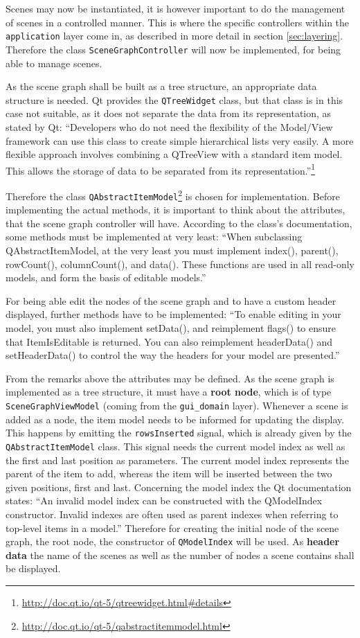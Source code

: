 \documentclass[10pt, openright, notitlepage]{scrreprt}
\begin{document}
Scenes may now be instantiated, it is however important to do the management of
scenes in a controlled manner. This is where the specific controllers within the
\texttt{application} layer come in, as described in more detail in section
\ref{sec:layering}. Therefore the class \texttt{SceneGraphController} will now be
implemented, for being able to manage scenes.

As the scene graph shall be built as a tree structure, an appropriate data
structure is needed. Qt provides the \texttt{QTreeWidget} class, but that
class is in this case not suitable, as it does not separate the data from its
representation, as stated by Qt: ``Developers who do not need the flexibility of
the Model/View framework can use this class to create simple hierarchical lists
very easily. A more flexible approach involves combining a QTreeView with a
standard item model. This allows the storage of data to be separated from its
representation.''\footnote{\url{http://doc.qt.io/qt-5/qtreewidget.html\#details}}

Therefore the class
\texttt{QAbstractItemModel}\footnote{\url{http://doc.qt.io/qt-5/qabstractitemmodel.html}}
is chosen for implementation. Before implementing the actual methods, it is
important to think about the attributes, that the scene graph controller will
have. According to the class's documentation, some methods must be implemented
at very least: ``When subclassing QAbstractItemModel, at the very least you must
implement index(), parent(), rowCount(), columnCount(), and data(). These
functions are used in all read-only models, and form the basis of editable
models.''

For being able edit the nodes of the scene graph and to have a custom header
displayed, further methods have to be implemented: ``To enable editing in your
model, you must also implement setData(), and reimplement flags() to ensure that
ItemIsEditable is returned. You can also reimplement headerData() and
setHeaderData() to control the way the headers for your model are presented.''

From the remarks above the attributes may be defined. As the scene graph is
implemented as a tree structure, it must have a \textbf{root node}, which is of type
\texttt{SceneGraphViewModel} (coming from the \texttt{gui\_domain} layer).
Whenever a scene is added as a node, the item model needs to be informed for
updating the display. This happens by emitting the \texttt{rowsInserted}
signal, which is already given by the \texttt{QAbstractItemModel} class. This
signal needs the current model index as well as the first and last position as
parameters. The current model index represents the parent of the item to add,
whereas the item will be inserted between the two given positions, first and
last. Concerning the model index the Qt documentation states: ``An invalid model
index can be constructed with the QModelIndex constructor. Invalid indexes are
often used as parent indexes when referring to top-level items in a model.''
Therefore for creating the initial node of the scene graph, the root node, the
constructor of \texttt{QModelIndex} will be used.
As \textbf{header data} the name of the scenes as well as the number of nodes a scene
contains shall be displayed.
\end{document}

